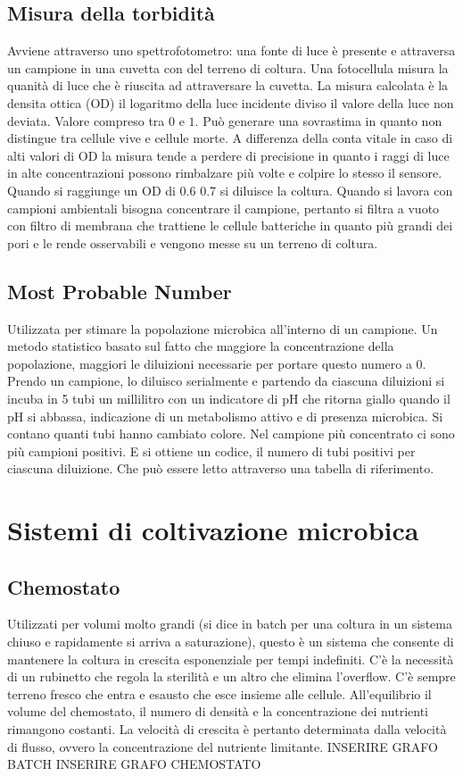 \subsection{Misura della torbidit\`a}
Avviene attraverso uno spettrofotometro: una fonte di luce \`e presente e attraversa un campione in una cuvetta con del terreno di coltura. Una fotocellula misura la quanit\`a di luce
che \`e riuscita ad attraversare la cuvetta. La misura calcolata \`e la densita ottica (OD) il logaritmo della luce incidente diviso il valore della luce non deviata. Valore compreso 
tra $0$ e $1$. Pu\`o generare una sovrastima in quanto non distingue tra cellule vive e cellule morte. A differenza della conta vitale in caso di alti valori di OD la misura tende a 
perdere di precisione in quanto i raggi di luce in alte concentrazioni possono rimbalzare pi\`u volte e colpire lo stesso il sensore. Quando si raggiunge un OD di 0.6 0.7 si diluisce
la coltura. 
Quando si lavora con campioni ambientali bisogna concentrare il campione, pertanto si filtra a vuoto con filtro di membrana che trattiene le cellule batteriche in quanto pi\`u grandi
dei pori e le rende osservabili e vengono messe su un terreno di coltura. 
\subsection{Most Probable Number}
Utilizzata per stimare la popolazione microbica all'interno di un campione. Un metodo statistico basato sul fatto che maggiore la concentrazione della popolazione, maggiori le diluizioni
necessarie per portare questo numero a $0$. Prendo un campione, lo diluisco serialmente e partendo da ciascuna diluizioni si incuba in 5 tubi un millilitro con un indicatore di pH che
ritorna giallo quando il pH si abbassa, indicazione di un metabolismo attivo e di presenza microbica. Si contano quanti tubi hanno cambiato colore. Nel campione pi\`u concentrato ci sono
pi\`u campioni positivi. E si ottiene un codice, il numero di tubi positivi per ciascuna diluizione. Che pu\`o essere letto attraverso una tabella di riferimento. 
\section{Sistemi di coltivazione microbica}
\subsection{Chemostato}
Utilizzati per volumi molto grandi (si dice in batch per una coltura in un sistema chiuso e rapidamente si arriva a saturazione), questo \`e un sistema che consente di mantenere la 
coltura in crescita esponenziale per tempi indefiniti. C'\`e la necessit\`a di un rubinetto che regola la sterilit\`a e un altro che elimina l'overflow. C'\`e sempre terreno fresco che
entra e esausto che esce insieme alle cellule. All'equilibrio il volume del chemostato, il numero di densit\`a e la concentrazione dei nutrienti rimangono costanti. La velocit\`a di 
crescita \`e pertanto determinata dalla velocit\` a di flusso, ovvero la concentrazione del nutriente limitante. 
INSERIRE GRAFO BATCH
INSERIRE GRAFO CHEMOSTATO
